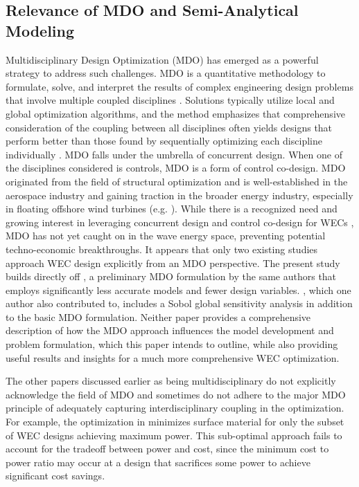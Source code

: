 \subsection{Relevance of MDO and Semi-Analytical Modeling}
Multidisciplinary Design Optimization (MDO) has emerged as a powerful strategy to address such challenges. MDO is a quantitative methodology to formulate, solve, and interpret the results of complex engineering design problems that involve multiple coupled disciplines \cite{agteMDOAssessmentDirection2009}. Solutions typically utilize local and global optimization algorithms, and the method emphasizes that comprehensive consideration of the coupling between all disciplines often yields designs that perform better than those found by sequentially optimizing each discipline individually \cite{martinsMultidisciplinaryDesignOptimization2013}. MDO falls under the umbrella of concurrent design. When one of the disciplines considered is controls, MDO is a form of control co-design. MDO originated from the field of structural optimization and is well-established in the aerospace industry and gaining traction in the broader energy industry, especially in floating offshore wind turbines (e.g. \cite{abbas_control_2024,jasa_effectively_2022,patryniak_multidisciplinary_2022}). While there is a recognized need and growing interest in leveraging concurrent design and control co-design for WECs \cite{mi_multi-scale_2025,ringwood_empowering_2023}, MDO has not yet caught on in the wave energy space, preventing potential techno-economic breakthroughs. It appears that only two existing studies \cite{mccabe_multidisciplinary_2022,khanal_multi-objective_2024} approach WEC design explicitly from an MDO perspective. The present study builds directly off \cite{mccabe_multidisciplinary_2022}, a preliminary MDO formulation by the same authors that employs significantly less accurate models and fewer design variables. \cite{khanal_multi-objective_2024}, which one author also contributed to, includes a Sobol global sensitivity analysis in addition to the basic MDO formulation. Neither paper provides a comprehensive description of how the MDO approach influences the model development and problem formulation, which this paper intends to outline, while also providing useful results and insights for a much more comprehensive WEC optimization. 

The other papers discussed earlier as being multidisciplinary do not explicitly acknowledge the field of MDO and sometimes do not adhere to the major MDO principle of adequately capturing interdisciplinary coupling in the optimization. For example, the optimization in \cite{edwards_optimisation_2022} minimizes surface material for only the subset of WEC designs achieving maximum power. This sub-optimal approach fails to account for the tradeoff between power and cost, since the minimum cost to power ratio may occur at a design that sacrifices some power to achieve significant cost savings.

